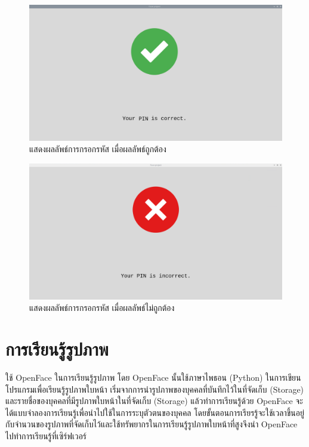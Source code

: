 \begin{figure}[ht]
  \begin{center}
    \includegraphics[scale=.3]{pic/pin_correct.png}
  \caption[แสดงผลลัพธ์การกรอกรหัส เมื่อผลลัพธ์ถูกต้อง]{แสดงผลลัพธ์การกรอกรหัส เมื่อผลลัพธ์ถูกต้อง}
  \end{center}
  \label{fig:confirmT}
\end{figure}

\begin{figure}[ht]
  \begin{center}
    \includegraphics[scale=.3]{pic/pin_incorrect.png}
  \caption[แสดงผลลัพธ์การกรอกรหัส เมื่อผลลัพธ์ไม่ถูกต้อง]{แสดงผลลัพธ์การกรอกรหัส เมื่อผลลัพธ์ไม่ถูกต้อง}
  \end{center}
  \label{fig:confirmF}
\end{figure}

\section{การเรียนรู้รูปภาพ}
ใช้ OpenFace ในการเรียนรู้รูปภาพ โดย OpenFace นั้นใช้ภาษาไพธอน (Python) ในการเขียนโปรแกรมเพื่อเรียนรู้รูปภาพใบหน้า เริ่มจากการนำรูปภาพของบุคคลที่บันทึกไว้ในที่จัดเก็บ (Storage) 
และรายชื่อของบุคคลที่มีรูปภาพใบหน้าในที่จัดเก็บ (Storage) แล้วทำการเรียนรู้ด้วย OpenFace จะได้แบบจำลองการเรียนรู้เพื่อนำไปใช้ในการระบุตัวตนของบุคคล 
โดยขั้นตอนการเรียรรู้จะใช้เวลาขึ้นอยู่กับจำนวนของรูปภาพที่จัดเก็บไว้และใช้ทรัพยากรในการเรียนรู้รูปภาพใบหน้าที่สูงจึงนำ OpenFace ไปทำการเรียนรู้ที่เซิร์ฟเวอร์

